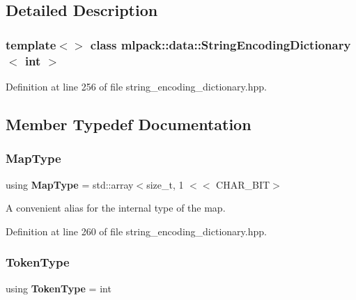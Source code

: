 \subsection{Detailed Description}
\subsubsection*{template$<$$>$\newline
class mlpack\+::data\+::\+String\+Encoding\+Dictionary$<$ int $>$}



Definition at line 256 of file string\+\_\+encoding\+\_\+dictionary.\+hpp.



\subsection{Member Typedef Documentation}
\mbox{\label{classmlpack_1_1data_1_1StringEncodingDictionary_3_01int_01_4_acdce5b1ef744012182d4c3b329c6fc8a}} 
\subsubsection{Map\+Type}
{\footnotesize\ttfamily using \textbf{ Map\+Type} =  std\+::array$<$size\+\_\+t, 1 $<$$<$ C\+H\+A\+R\+\_\+\+B\+IT$>$}



A convenient alias for the internal type of the map. 



Definition at line 260 of file string\+\_\+encoding\+\_\+dictionary.\+hpp.

\mbox{\label{classmlpack_1_1data_1_1StringEncodingDictionary_3_01int_01_4_a80e7e247aa7b4392b900c808645a26cb}} 
\subsubsection{Token\+Type}
{\footnotesize\ttfamily using \textbf{ Token\+Type} =  int}



